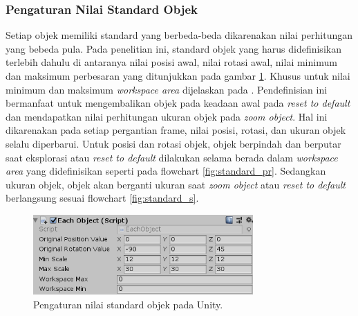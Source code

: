 		\subsubsection{Pengaturan Nilai Standard Objek} \label{section:standard}
		\vspace{0.5ex}
			Setiap objek memiliki standard yang berbeda-beda dikarenakan nilai perhitungan yang bebeda pula. Pada penelitian ini, standard objek yang harus didefinisikan terlebih dahulu di antaranya nilai posisi awal, nilai rotasi awal, nilai minimum dan maksimum perbesaran yang ditunjukkan pada gambar \ref{fig:eachobject}. Khusus untuk nilai minimum dan maksimum \textit{workspace area} dijelaskan pada . Pendefinisian ini bermanfaat untuk mengembalikan objek pada keadaan awal pada \textit{reset to default} dan mendapatkan nilai perhitungan ukuran objek pada \textit{zoom object}. Hal ini dikarenakan pada setiap pergantian frame, nilai posisi, rotasi, dan ukuran objek selalu diperbarui. Untuk posisi dan rotasi objek, objek berpindah dan berputar saat eksplorasi atau \textit{reset to default} dilakukan selama berada dalam \textit{workspace area} yang didefinisikan seperti pada flowchart \ref{fig:standard_pr}. Sedangkan ukuran objek, objek akan berganti ukuran saat \textit{zoom object} atau \textit{reset to default} berlangsung sesuai flowchart \ref{fig:standard_s}. 
			\begin{figure}[H]
				\includegraphics[width=0.75\textwidth]{img/bab3/eachobject.png}
				\caption{Pengaturan nilai standard objek pada Unity.}
				\label{fig:eachobject}
			\end{figure}
			\vspace{-2ex}
